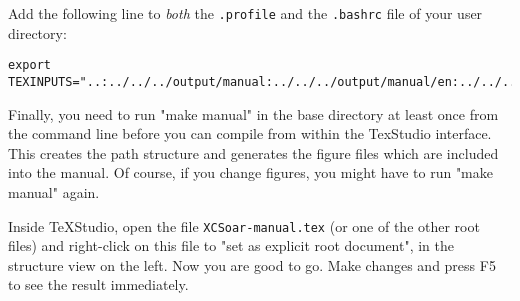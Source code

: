 Add the following line to \emph{both} the \texttt{.profile} and the \texttt{.bashrc} file of your user directory:
\begin{maxipage}
\begin{verbatim}
export TEXINPUTS="..:../../../output/manual:../../../output/manual/en:../../..:"
\end{verbatim}
\end{maxipage}


Finally, you need to run "make manual" in the \xc base directory at least once from the command line before you can compile from within the TexStudio interface. This creates the path structure and generates the figure files which are included into the manual. Of course, if you change figures, you might have to run "make manual" again.

Inside TeXStudio, open the file \texttt{XCSoar-manual.tex} (or one of the other root files) and right-click on this file to "set as explicit root document", in the structure view on the left. Now you are good to go. Make changes and press F5 to see the result immediately.

